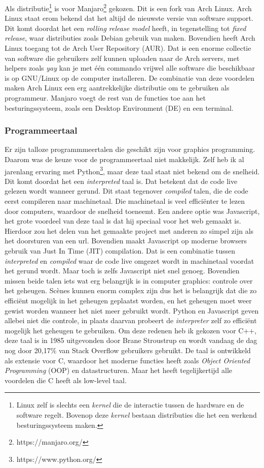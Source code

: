 \documentclass[12pt, a4paper]{article}
\begin{document}
Als distributie\footnote{Linux zelf is slechts een \emph{kernel} die de interactie tussen de hardware en de software regelt. Bovenop deze \emph{kernel} bestaan distributies die het een werkend besturingssysteem maken.} is voor Manjaro\footnote{https://manjaro.org/} gekozen. Dit is een fork van Arch Linux. Arch Linux staat erom bekend dat het altijd de nieuwste versie van software support. Dit komt doordat het een \emph{rolling release model} heeft, in tegenstelling tot \emph{fixed release}, waar distributies zoals Debian gebruik van maken. Bovendien heeft Arch Linux toegang tot de Arch User Repository (AUR). Dat is een enorme collectie van software die gebruikers zelf kunnen uploaden naar de Arch servers, met helpers zoals \emph{yay} kan je met één commando vrijwel alle software die beschikbaar is op GNU/Linux op de computer installeren. De combinatie van deze voordelen maken Arch Linux een erg aantrekkelijke distributie om te gebruiken als programmeur. Manjaro voegt de rest van de functies toe aan het besturingssysteem, zoals een Desktop Environment (DE) en een terminal.
\subsubsection{Programmeertaal}
Er zijn talloze programmmeertalen die geschikt zijn voor graphics programming. Daarom was de keuze voor de programmeertaal niet makkelijk. Zelf heb ik al jarenlang ervaring met Python\footnote{https://www.python.org/}, maar deze taal staat niet bekend om de snelheid. Dit komt doordat het een \emph{interpreted} taal is. Dat betekent dat de code live gelezen wordt wanneer gerund. Dit staat tegenover \emph{compiled} talen, die de code eerst compileren naar machinetaal. Die machinetaal is veel efficiënter te lezen door computers, waardoor de snelheid toeneemt. Een andere optie was Javascript, het grote voordeel van deze taal is dat hij speciaal voor het web gemaakt is. Hierdoor zou het delen van het gemaakte project met anderen zo simpel zijn als het doorsturen van een url. Bovendien maakt Javascript op moderne browsers gebruik van Just In Time (JIT) compilation. Dat is een combinatie tussen \emph{interpreted} en \emph{compiled} waar de code live omgezet wordt in machinetaal voordat het gerund wordt. Maar toch is zelfs Javascript niet snel genoeg. Bovendien missen beide talen iets wat erg belangrijk is in computer graphics: controle over het geheugen. Scènes kunnen enorm complex zijn dus het is belangrijk dat die zo efficiënt mogelijk in het geheugen geplaatst worden, en het geheugen moet weer gewist worden wanneer het niet meer gebruikt wordt. Python en Javascript geven allebei niet die controle, in plaats daarvan probeert de \emph{interpreter} zelf zo efficiënt mogelijk het geheugen te gebruiken. Om deze redenen heb ik gekozen voor C++, deze taal is in 1985 uitgevonden door Brane Stroustrup en wordt vandaag de dag nog door 20,17\% van Stack Overflow gebruikers gebruikt\cite{StackOverflowSurvey}. De taal is ontwikkeld als extensie voor C, waardoor het moderne functies heeft zoals \emph{Object Oriented Programming} (OOP) en datastructuren. Maar het heeft tegelijkertijd alle voordelen die C heeft als low-level taal. 
\end{document}
